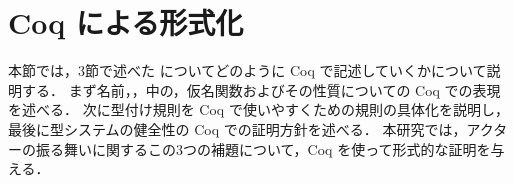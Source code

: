 \section{Coq による形式化}

本節では，3節で述べた \api についてどのように Coq で記述していくかについて説明する．
まず名前，\conf，\conf 中の\free，仮名関数およびその性質についての Coq での表現を述べる．
次に型付け規則を Coq で使いやすくための規則の具体化を説明し，最後に型システムの健全性の Coq での証明方針を述べる．
本研究では，アクターの振る舞いに関するこの3つの補題について，Coq を使って形式的な証明を与える．







